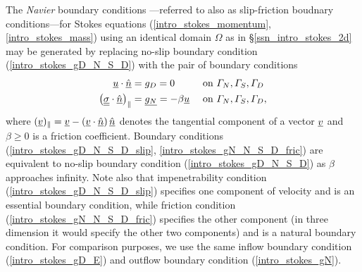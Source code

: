 The \emph{Navier} boundary conditions \citep{navier_1823}---referred to also as slip-friction boudnary conditions---for Stokes equations (\ref{intro_stokes_momentum}, \ref{intro_stokes_mass}) using an identical domain $\Omega$ as in \S \ref{ssn_intro_stokes_2d} may be generated by replacing no-slip boundary condition (\ref{intro_stokes_gD_N_S_D}) with the pair of boundary conditions
\begin{align}
  \label{intro_stokes_gD_N_S_D_slip}
  \underline{u} \cdot \underline{\hat{n}} &= g_D = 0 &&\text{ on } \varGamma_N, \varGamma_S, \varGamma_D \\
  \label{intro_stokes_gN_N_S_D_fric}
  \left( \underline{\underline{\sigma}} \cdot \underline{\hat{n}} \right)_{\Vert} &= \underline{g_N} = -\beta \underline{u} &&\text{ on } \varGamma_N, \varGamma_S, \varGamma_D,
\end{align}
where $(\underline{v})_{\Vert} = \underline{v} - \left( \underline{v} \cdot \underline{\hat{n}} \right) \underline{\hat{n}}$ denotes the tangential component of a vector $\underline{v}$ and $\beta \geq 0$ is a friction coefficient.  Boundary conditions (\ref{intro_stokes_gD_N_S_D_slip}, \ref{intro_stokes_gN_N_S_D_fric}) are equivalent to no-slip boundary condition (\ref{intro_stokes_gD_N_S_D}) as $\beta$ approaches infinity.  Note also that impenetrability condition (\ref{intro_stokes_gD_N_S_D_slip}) specifies one component of velocity and is an essential boundary condition, while friction condition (\ref{intro_stokes_gN_N_S_D_fric}) specifies the other component (in three dimension it would specify the other two components) and is a natural boundary condition.  For comparison purposes, we use the same inflow boundary condition (\ref{intro_stokes_gD_E}) and outflow boundary condition (\ref{intro_stokes_gN}).

